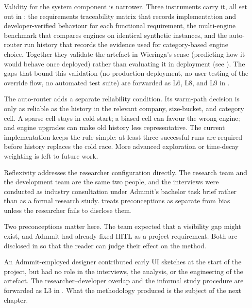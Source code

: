 Validity for the system component is narrower. Three instruments carry it, all set out in : the requirements traceability matrix that records implementation and developer-verified behaviour for each functional requirement, the multi-engine benchmark that compares engines on identical synthetic instances, and the auto-router run history that records the evidence used for category-based engine choice. Together they validate the artefact in Wieringa's sense (predicting how it would behave once deployed) rather than evaluating it in deployment (see ). The gaps that bound this validation (no production deployment, no user testing of the override flow, no automated test suite) are forwarded as L6, L8, and L9 in .

The auto-router adds a separate reliability condition. Its warm-path decision is only as reliable as the history in the relevant company, size-bucket, and category cell. A sparse cell stays in cold start; a biased cell can favour the wrong engine; and engine upgrades can make old history less representative. The current implementation keeps the rule simple: at least three successful runs are required before history replaces the cold race. More advanced exploration or time-decay weighting is left to future work.

Reflexivity addresses the researcher configuration directly. The research team and the development team are the same two people, and the interviews were conducted as industry consultation under Admmit's bachelor task brief rather than as a formal research study. \textcite[p.~484]{malterud2001lancet} treats preconceptions as separate from bias unless the researcher fails to disclose them.

Two preconceptions matter here. The team expected that a visibility gap might exist, and Admmit had already fixed HITL as a project requirement. Both are disclosed in  so that the reader can judge their effect on the method.

An Admmit-employed designer contributed early UI sketches at the start of the project, but had no role in the interviews, the analysis, or the engineering of the artefact. The researcher--developer overlap and the informal study procedure are forwarded as L3 in . What the methodology produced is the subject of the next chapter.
